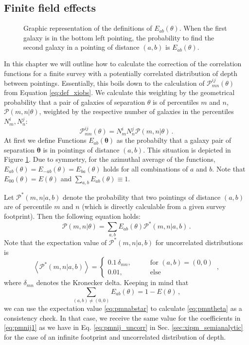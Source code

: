 \documentclass[referee]{aa} %
\renewcommand{\[}{\begin{equation}}
\renewcommand{\]}{\end{equation}}
\def\b#1{\bm{#1}}
\def\la{\left<}
\def\ra{\right>}
\begin{document}
\begin{appendix}
\section{Finite field effects}
\label{sec:expand_eoftheta}
\begin{figure}
    \centering
    \def\svgwidth{200pt}    
      
    \caption{Graphic representation of the definitions of $E_{ab}(\theta)$. When the first galaxy is in the bottom left pointing, the probability to find the second galaxy in a pointing of distance $(a,b)$ is $E_{ab}(\theta)$.}
    \label{fig:expand_etheta}
\end{figure}
In this chapter we will outline how to calculate the correction of the correlation functions for a finite survey with a potentially correlated distribution of depth between pointings. Essentially, this boils down to the calculation of $\mathcal{P}_{mn}^{ij}(\theta)$ from Equation \eqref{eq:def_xiobs}. We calculate this weighting by the geometrical probability that a pair of galaxies of separation $\theta$ is of percentiles $m$ and $n$, $\mathcal{P}(m,n|\theta)$, weighted by the respective number of galaxies in the percentiles $N_m^i,N_n^j$: \[
\mathcal{P}_{mn}^{ij}(\theta) = N_m^iN_n^j\mathcal{P}(m,n|\theta)\, .
\label{eq:pmnij1}
\]
 At first we define Functions $E_{ab}(\b\theta)$ as the probabilty that a galaxy pair of separation $\b\theta$ is in pointings of distance $(a,b)$. This situation is depicted in Figure \ref{fig:expand_etheta}. Due to symmetry, for the azimuthal average of the functions, $E_{ab}(\theta) = E_{-ab}(\theta) = E_{ba}(\theta)$ holds for all combinations of $a$ and $b$. Note that $E_{00}(\theta)=E(\theta)$ and $\sum_{a,b}E_{ab}(\theta)\equiv 1$.

Let $\mathcal{P}^*(m,n|a,b)$ denote the probability that two pointings of distance $(a,b)$ are of percentile $m$ and $n$ (which is directly calculable from a given survey footprint). 
Then the following equation holds: \[
\mathcal{P}(m,n|\theta) = \sum_{a,b} E_{ab}(\theta)\mathcal{P}^*(m,n|a,b)\, .
\label{eq:pmntheta}
\]
Note that the expectation value of $\mathcal{P}^*(m,n|a,b)$ for uncorrelated distributions is \[
\la \mathcal{P}^*(m,n|a,b)\ra = \begin{cases}
0.1\,\delta_{mn},\qquad & \text{for }(a,b)=(0,0) \\
0.01, & \text{else}
\end{cases}\, ,
\label{eq:pmnabstar}
\]
where $\delta_{mn}$ denotes the Kronecker delta. Keeping in mind that \[
\sum_{(a,b)\neq (0,0)} E_{ab}(\theta) = 1-E(\theta)\, ,
\]
we can use the expectation value \eqref{eq:pmnabstar} to calculate \eqref{eq:pmntheta} as a consistency check. In that case, we receive the same value for the coefficients in \eqref{eq:pmnij1} as we have in Eq. \eqref{eq:pmnij_uncorr} in Sec. \ref{sec:xipm_semianalytic} for the case of an infinite footprint and uncorrelated distribution of depth.


\end{appendix}
\end{document}
